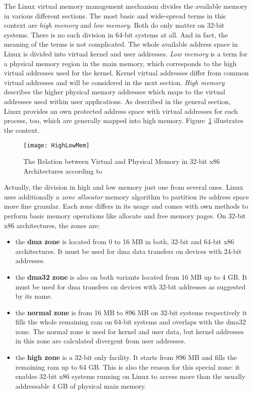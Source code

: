 The Linux virtual memory management mechanism divides the available memory in various different sections.
The most basic and wide-spread terms in this context are \textit{high memory} and \textit{low memory}.
Both do only matter on 32-bit systems.
There is no such division in 64-bit systems at all.
And in fact, the meaning of the terms is not complicated.
The whole available address space in Linux is divided into virtual kernel and user addresses.
\textit{Low memory} is a term for a physical memory region in the main memory, which corresponds to the high virtual addresses used for the kernel. 
Kernel virtual addresses differ from common virtual addresses and will be considered in the next section.
\textit{High memory} describes the higher physical memory addresses which maps to the virtual addresses used within user applications.
As described in the general section, Linux provides an own protected address space with virtual addresses for each process, too, which are generally mapped into high memory\cite{lfd430}.
Figure~\ref{pic:high-low-mem} illustrates the context.

\begin{figure} [t]
	\centering
	\texttt{[image: HighLowMem]}
	\caption{The Relation between Virtual and Physical Memory in 32-bit x86 Architectures according to~\cite{lfd430}}\label{pic:high-low-mem}
\end{figure}
%
Actually, the division in high and low memory just one from several ones. 
Linux uses additionally a \textit{zone allocator} memory algorithm to partition its address space more fine granular.
Each zone differs in its usage and comes with own methods to perform basic memory operations like allocate and free memory pages\cite{lfd430}.
On 32-bit x86 architectures, the zones are:
\begin{itemize}
    \item the \textbf{\ac{dma} zone} is located from 0 to 16 MB in both, 32-bit and 64-bit x86 architectures. It must be used for \ac{dma} data transfers on devices with 24-bit addresses.
    \item the \textbf{\ac{dma}32 zone} is also on both variants located from 16 MB up to 4 GB\@. It must be used for \ac{dma} transfers on devices with 32-bit addresses as suggested by its name.
    \item the \textbf{normal zone} is from 16 MB to 896 MB on 32-bit systems respectively it fills the whole remaining \ac{ram} on 64-bit systems and overlaps with the \ac{dma}32 zone. The normal zone is used for kernel and user data, but kernel addresses in this zone are calculated divergent from user addresses.
    \item the \textbf{high zone} is a 32-bit only facility. It starts from 896 MB and fills the remaining \ac{ram} up to 64 GB\@. This is also the reason for this special zone: it enables 32-bit x86 systems running on Linux to access more than the usually addressable 4 GB of physical main memory\cite{lfd430}.
\end{itemize}

